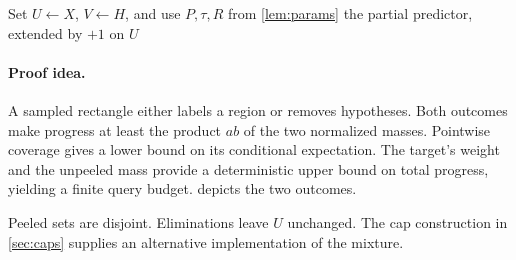 \begin{algorithm}[t]
\caption{RECTIFY: rectangle peeling and elimination}\label{alg:rectify}
Set $U\gets X$, $V\gets H$, and use $P,\tau,R$ from \cref{lem:params}\;
\Return the partial predictor, extended by $+1$ on $U$\;
\end{algorithm}

\paragraph{Proof idea.}
A sampled rectangle either labels a region or removes hypotheses. Both outcomes make progress at least the product $ab$ of the two normalized masses. Pointwise coverage gives a lower bound on its conditional expectation. The target's weight and the unpeeled mass provide a deterministic upper bound on total progress, yielding a finite query budget.  depicts the two outcomes.



Peeled sets are disjoint. Eliminations leave $U$ unchanged. The cap construction in \cref{sec:caps} supplies an alternative implementation of the mixture.

